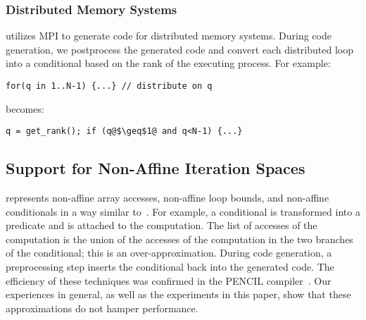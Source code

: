 \subsubsection{Distributed Memory Systems}

\framework{} utilizes MPI to generate code for distributed memory systems.  During code generation, we postprocess the generated code and convert each distributed loop into a conditional based on the rank of the executing process. For example:
\vspace{-0.15cm}
\begin{lstlisting}[numbers=none]
for(q in 1..N-1) {...} // distribute on q
\end{lstlisting}
\vspace{-0.15cm}
becomes:
\vspace{-0.15cm}
\begin{lstlisting}[escapechar=@,numbers=none]
q = get_rank(); if (q@$\geq$1@ and q<N-1) {...}
\end{lstlisting}



\vspace{-0.25cm}
\subsection{Support for Non-Affine Iteration Spaces\label{nonaffine}}

\framework represents non-affine array accesses, non-affine loop bounds, and non-affine conditionals in a way similar to~\citet{Benabderrahmane}.
For example, a conditional is transformed into a predicate and is attached to the computation.  The list of accesses of the computation is the union of the accesses of the computation in the two branches of the conditional; this is an over-approximation. During code generation, a preprocessing step inserts the conditional back into the generated code.  The efficiency of these techniques was confirmed in the PENCIL compiler~\cite{pencil}. Our experiences in general, as well as the experiments in this paper, show that these approximations do not hamper performance.

